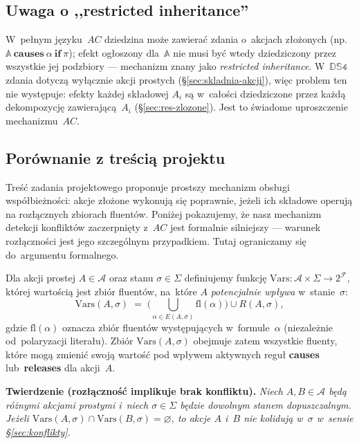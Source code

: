 \documentclass[11pt,a4paper]{article}
\newif\ifshowbib
\newcommand{\bibonly}[1]{\ifshowbib#1\fi}
\renewcommand{\cite}[2][]{\unskip}%
\newcommand{\causes}{\textbf{causes}}
\renewcommand{\iff}{\textbf{if}}
\newcommand{\releases}{\textbf{releases}}
\theoremstyle{definition}
\begin{document}
\subsection{Uwaga o ,,restricted inheritance''}
\label{sec:restricted-inheritance}

W~pełnym języku~$AC$\bibonly{~\cite{rw05}} dziedzina może zawierać zdania
o~akcjach złożonych (np.\ $\mathbb{A}\ \causes\ \alpha\ \iff\ \pi$); efekt ogłoszony
dla~$\mathbb{A}$ nie musi być wtedy dziedziczony przez wszystkie jej podzbiory ---
mechanizm znany jako \emph{restricted inheritance}. W~$\mathbb{DS4}$ zdania dotyczą
wyłącznie akcji prostych (\S\ref{sec:skladnia-akcji}), więc problem ten nie występuje:
efekty każdej składowej $A_i$ są w~całości dziedziczone przez każdą dekompozycję
zawierającą~$A_i$ (\S\ref{sec:res-zlozone}). Jest to świadome uproszczenie mechanizmu~$AC$.

\subsection{Porównanie z treścią projektu}
\label{sec:porownanie-rozlacznosc}

Treść zadania projektowego\bibonly{~\cite{projekt4}} proponuje prostszy
mechanizm obsługi współbieżności: akcje złożone wykonują się poprawnie,
jeżeli ich składowe operują na rozłącznych zbiorach fluentów. Poniżej
pokazujemy, że nasz mechanizm detekcji konfliktów zaczerpnięty z~$AC$
jest formalnie silniejszy --- warunek rozłączności jest jego szczególnym
przypadkiem. Tutaj ograniczamy się do~argumentu formalnego.

\medskip
\noindent Dla akcji prostej $A \in \mathcal{A}$ oraz stanu $\sigma \in \Sigma$
definiujemy funkcję $\mathrm{Vars} : \mathcal{A} \times \Sigma \to 2^{\mathcal{F}}$,
której wartością jest zbiór fluentów, na~które $A$ \emph{potencjalnie wpływa}
w~stanie~$\sigma$:
\[
  \mathrm{Vars}(A,\sigma)
    \;=\; \Big(\bigcup_{\alpha \in E(A,\sigma)} \mathrm{fl}(\alpha)\Big)
    \cup R(A,\sigma),
\]
gdzie $\mathrm{fl}(\alpha)$ oznacza zbiór fluentów występujących
w~formule~$\alpha$ (niezależnie od~polaryzacji literału). Zbiór
$\mathrm{Vars}(A,\sigma)$ obejmuje zatem wszystkie fluenty, które mogą
zmienić swoją wartość pod wpływem aktywnych reguł \causes{} lub~\releases{}
dla akcji~$A$.

\medskip
\noindent \textbf{Twierdzenie (rozłączność implikuje brak konfliktu).}
\emph{Niech $A, B \in \mathcal{A}$ będą różnymi akcjami prostymi
i~niech $\sigma \in \Sigma$ będzie dowolnym stanem dopuszczalnym.
Jeżeli $\mathrm{Vars}(A,\sigma) \cap \mathrm{Vars}(B,\sigma) = \varnothing$,
to akcje $A$ i~$B$ nie kolidują w~$\sigma$ w~sensie
\S\ref{sec:konflikty}.}
\end{document}
